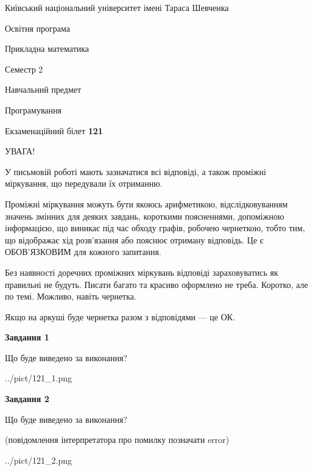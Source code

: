 \documentclass[12pt, ukrainian]{article}
\begin{document}
{{\begin {small}\par
{ \center  Київський національний університет імені Тараса Шевченка \par}
{\parbox {5 cm}{Освітня програма \hfill}{\parbox {7 cm}{Прикладна математика\hfill}}\parbox {6 cm}{\hfill Семестр 2}}\par
{\parbox {5 cm} {Навчальний предмет \hfill}\parbox {7 cm}{Програмування \hfill}\parbox {6cm}{\hfill}\par}\vspace{-7pt} \end{small}}{\center Екзаменаційний білет \No \textbf
{ 121 }\par}}
{
\begin {large}
УВАГА!

У письмовій роботі мають зазначатися всі відповіді, а також проміжні міркування, що передували їх отриманню.

Проміжні міркування можуть бути якоюсь арифметикою, відслідковуванням зна\-чень змінних для деяких завдань,
короткими поясненнями, допоміжною інформацією, що виникає під час обходу графів, робочею чернеткою,
тобто тим, що відображає хід розв’язання або пояснює отриману відповідь.
Це є ОБОВ’ЯЗКОВИМ для кожного запитання.

Без наявності доречних проміжних міркувань відповіді зараховуватись як правиль\-ні не будуть.
Писати багато та красиво оформлено не треба. Коротко, але по темі. Можли\-во, навіть чернетка.

Якщо на аркуші буде чернетка разом з відповідями --- це ОК.

\newpage

{\begin {center}\textbf{Завдання 1}\end {center}}\par
Що буде виведено за виконання?\par
\begin{center}
	{../pict/121_1.png}
\end{center}
\newpage

{\begin {center}\textbf{Завдання 2}\end {center}}\par
Що буде виведено за виконання?\par
 (повідомлення інтерпретатора про помилку позначати error)\par
\begin{center}
	{../pict/121_2.png}
\end{center}
\newpage


\end{large}}
\end{document}
